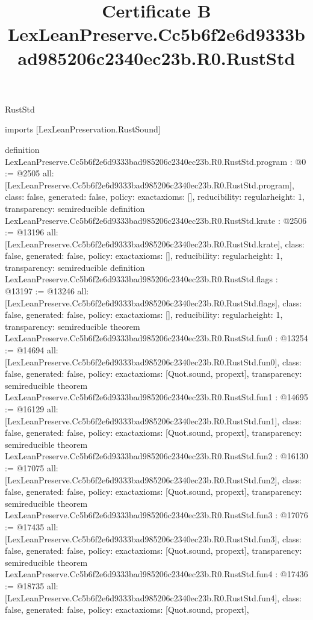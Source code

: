 \begin{lexlean}{RustStd}
\title{Certificate B LexLeanPreserve.Cc5b6f2e6d9333bad985206c2340ec23b.R0.RustStd}
\begin{coremodule}
imports [LexLeanPreservation.RustSound]

definition LexLeanPreserve.Cc5b6f2e6d9333bad985206c2340ec23b.R0.RustStd.program : @0 := @2505 {
  all: [LexLeanPreserve.Cc5b6f2e6d9333bad985206c2340ec23b.R0.RustStd.program],
  class: false,
  generated: false,
  policy: exact{axioms: []},
  reducibility: regular{height: 1},
  transparency: semireducible
}
definition LexLeanPreserve.Cc5b6f2e6d9333bad985206c2340ec23b.R0.RustStd.krate : @2506 := @13196 {
  all: [LexLeanPreserve.Cc5b6f2e6d9333bad985206c2340ec23b.R0.RustStd.krate],
  class: false,
  generated: false,
  policy: exact{axioms: []},
  reducibility: regular{height: 1},
  transparency: semireducible
}
definition LexLeanPreserve.Cc5b6f2e6d9333bad985206c2340ec23b.R0.RustStd.flags : @13197 := @13246 {
  all: [LexLeanPreserve.Cc5b6f2e6d9333bad985206c2340ec23b.R0.RustStd.flags],
  class: false,
  generated: false,
  policy: exact{axioms: []},
  reducibility: regular{height: 1},
  transparency: semireducible
}
theorem LexLeanPreserve.Cc5b6f2e6d9333bad985206c2340ec23b.R0.RustStd.fun0 : @13254 := @14694 {
  all: [LexLeanPreserve.Cc5b6f2e6d9333bad985206c2340ec23b.R0.RustStd.fun0],
  class: false,
  generated: false,
  policy: exact{axioms: [Quot.sound, propext]},
  transparency: semireducible
}
theorem LexLeanPreserve.Cc5b6f2e6d9333bad985206c2340ec23b.R0.RustStd.fun1 : @14695 := @16129 {
  all: [LexLeanPreserve.Cc5b6f2e6d9333bad985206c2340ec23b.R0.RustStd.fun1],
  class: false,
  generated: false,
  policy: exact{axioms: [Quot.sound, propext]},
  transparency: semireducible
}
theorem LexLeanPreserve.Cc5b6f2e6d9333bad985206c2340ec23b.R0.RustStd.fun2 : @16130 := @17075 {
  all: [LexLeanPreserve.Cc5b6f2e6d9333bad985206c2340ec23b.R0.RustStd.fun2],
  class: false,
  generated: false,
  policy: exact{axioms: [Quot.sound, propext]},
  transparency: semireducible
}
theorem LexLeanPreserve.Cc5b6f2e6d9333bad985206c2340ec23b.R0.RustStd.fun3 : @17076 := @17435 {
  all: [LexLeanPreserve.Cc5b6f2e6d9333bad985206c2340ec23b.R0.RustStd.fun3],
  class: false,
  generated: false,
  policy: exact{axioms: [Quot.sound, propext]},
  transparency: semireducible
}
theorem LexLeanPreserve.Cc5b6f2e6d9333bad985206c2340ec23b.R0.RustStd.fun4 : @17436 := @18735 {
  all: [LexLeanPreserve.Cc5b6f2e6d9333bad985206c2340ec23b.R0.RustStd.fun4],
  class: false,
  generated: false,
  policy: exact{axioms: [Quot.sound, propext]},
}
\end{coremodule}
\end{lexlean}
